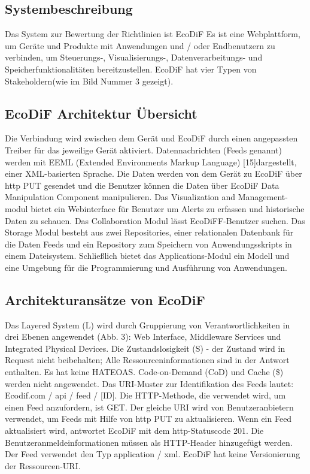\documentclass{acmsiggraph}
\begin{document}
\subsection{Systembeschreibung}
Das System zur Bewertung der Richtlinien ist EcoDiF
Es ist eine Webplattform, um Geräte und Produkte mit Anwendungen und / oder Endbenutzern zu verbinden, um Steuerungs-, Visualisierungs-, Datenverarbeitungs- und Speicherfunktionalitäten bereitzustellen. EcoDiF hat vier Typen von Stakeholdern(wie im Bild Nummer 3 gezeigt).
\subsection{EcoDiF Architektur Übersicht}
Die Verbindung wird zwischen dem Gerät und EcoDiF durch einen angepassten Treiber für das jeweilige Gerät aktiviert.
Datennachrichten (Feeds genannt) werden mit EEML (Extended Environments Markup Language) [15]dargestellt, einer XML-basierten Sprache. 
Die Daten werden von dem Gerät zu EcoDiF über http PUT gesendet und die Benutzer können die Daten über EcoDiF Data Manipulation Component manipulieren.
Das Visualization and Management-modul bietet ein Webinterface für Benutzer um Alerts zu erfassen und historische Daten zu schauen.
Das Collaboration Modul lässt EcoDiFF-Benutzer suchen. Das Storage Modul besteht aus zwei Repositories, einer relationalen Datenbank für die Daten Feeds und ein Repository zum Speichern von Anwendungsskripts in einem Dateisystem.
Schließlich bietet das Applications-Modul ein Modell und eine Umgebung für die Programmierung und Ausführung von Anwendungen.

\subsection{Architekturansätze von EcoDiF}
Das Layered System (L) wird durch Gruppierung von Verantwortlichkeiten in drei Ebenen angewendet (Abb. 3): Web Interface, Middleware Services und Integrated Physical Devices.
Die Zustandslosigkeit (S) - der Zustand wird in Request nicht beibehalten; Alle Ressourceninformationen sind in der Antwort enthalten. Es hat keine HATEOAS. Code-on-Demand (CoD) und Cache (\$) werden nicht angewendet.
Das URI-Muster zur Identifikation des Feeds lautet:
Ecodif.com / api / feed / [ID]. Die HTTP-Methode, die verwendet wird, um einen Feed anzufordern, ist GET. Der gleiche URI wird von Benutzeranbietern verwendet, um Feeds mit Hilfe von http PUT zu aktualisieren. Wenn ein Feed aktualisiert wird, antwortet EcoDiF mit dem http-Statuscode 201.
Die Benutzeranmeldeinformationen müssen als HTTP-Header hinzugefügt werden.
Der Feed verwendet den Typ application / xml.
EcoDiF hat keine Versionierung der Ressourcen-URI.
\end{document}
